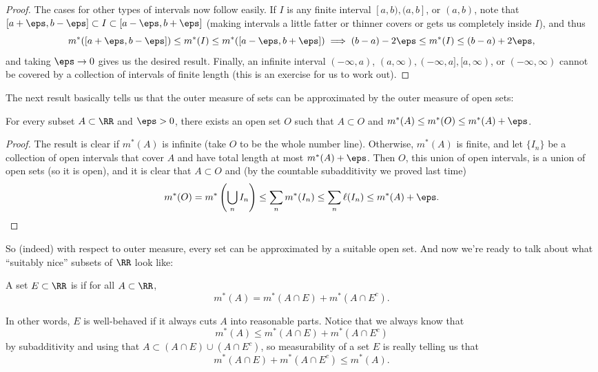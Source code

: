 \begin{proof}
The cases for other types of intervals now follow easily. If $I$ is any finite interval $[a, b), (a, b]$, or $(a, b)$, note that $[a + \eps, b - \eps] \subset I \subset [a - \eps, b + \eps]$ (making intervals a little fatter or thinner covers or gets us completely inside $I$), and thus 
\[
    m^\ast([a + \eps, b - \eps]) \le m^\ast(I) \le m^\ast([a - \eps, b + \eps]) \implies (b-a) - 2\eps \le m^\ast(I) \le (b-a) + 2\eps,
\]
and taking $\eps \to 0$ gives us the desired result. Finally, an infinite interval $(-\infty, a)$, $(a, \infty), (-\infty, a], [a, \infty)$, or $(-\infty, \infty)$ cannot be covered by a collection of intervals of finite length (this is an exercise for us to work out). 
\end{proof}

The next result basically tells us that the outer measure of sets can be approximated by the outer measure of open sets:

\begin{theorem}
For every subset $A \subset \RR$ and $\eps > 0$, there exists an open set $O$ such that $A \subset O$ and $m^\ast(A) \le m^\ast(O) \le m^\ast(A) + \eps$.
\end{theorem}
\begin{proof}
The result is clear if $m^\ast(A)$ is infinite (take $O$ to be the whole number line). Otherwise, $m^\ast(A)$ is finite, and let $\{I_n\}$ be a collection of open intervals that cover $A$ and have total length at most $m^\ast(A) + \eps$. Then $O$, this union of open intervals, is a union of open sets (so it is open), and it is clear that $A \subset O$ and (by the countable subadditivity we proved last time) 
\[
    m^\ast(O) = m^\ast\left(\bigcup_n I_n\right) \le \sum_n m^\ast(I_n) \le \sum_n \ell(I_n) \le m^\ast(A) + \eps.
\]
\end{proof}

So (indeed) with respect to outer measure, every set can be approximated by a suitable open set. And now we're ready to talk about what ``suitably nice'' subsets of $\RR$ look like:

\begin{definition}
A set $E \subset \RR$ is  if for all $A \subset \RR$, 
\[
    m^\ast(A) = m^\ast(A \cap E) + m^\ast(A \cap E^c).
\]
\end{definition}

In other words, $E$ is well-behaved if it always cuts $A$ into reasonable parts. Notice that we always know that
\[
    m^\ast(A) \le m^\ast(A \cap E) + m^\ast(A \cap E^c)
\]
by subadditivity and using that $A \subset (A \cap E) \cup (A \cap E^c)$, so measurability of a set $E$ is really telling us that \[
    m^\ast(A \cap E) + m^\ast(A \cap E^c) \le m^\ast(A).
\]

